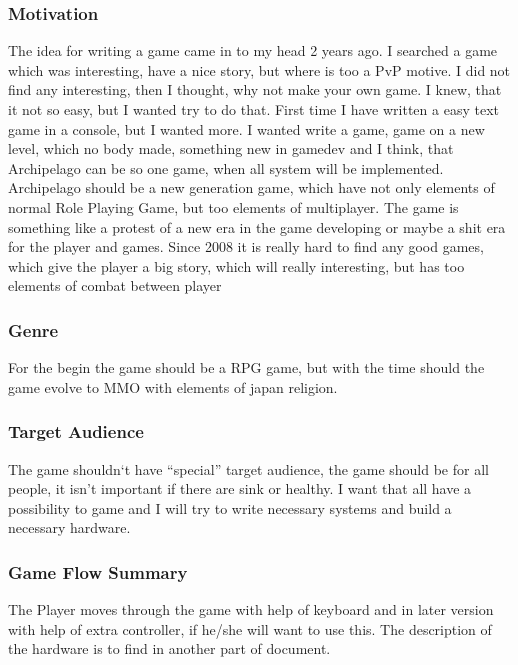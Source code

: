\documentclass[parskip=full]{scrartcl}
\begin{document}
				\subsubsection{Motivation} \vspace{-5mm}
					\par \begingroup
					\leftskip=2cm
					\noindent
							The idea for writing a game came in to my head 2 years ago. I searched a game which was interesting, have a nice story, but where is too a PvP motive. I did not find any interesting, then I thought, why not make your own game. I knew, that it not so easy, but I wanted try to do that. First time I have written a easy text game in a console, but I wanted more. I wanted write a game, game on a new level, which no body made, something new in gamedev and I think, that Archipelago can be so one game, when all system will be implemented. Archipelago should be a new generation game, which have not only elements of normal Role Playing Game, but too elements of multiplayer. The game is something like a protest of a new era in the game developing or maybe a shit era for the player and games. Since 2008 it is really hard to find any good games, which give the player a big story, which will really interesting, but has too elements of combat between player 
					\par \endgroup
				\subsubsection{Genre} \vspace{-5mm}
					\par \begingroup
					\leftskip=2cm
					\noindent
							For the begin the game should be a RPG game, but with the time should the game evolve
							to MMO with elements of japan religion. 
					\par \endgroup
				\subsubsection{Target Audience} \vspace{-5mm}
					\par \begingroup
					\leftskip=2cm
					\noindent
							The game shouldn‘t have “special” target audience, the game should be for all people, it isn’t important if there are sink or healthy. I want that all have a possibility to game and I will try to write necessary systems and build a necessary hardware. 
					\par \endgroup
				\subsubsection{Game Flow Summary} \vspace{-5mm}
					\par \begingroup
					\leftskip=2cm
					\noindent
							The Player moves through the game with help of keyboard and in later version with help of extra controller, if he/she will want to use this. The description of the hardware is to find in another part of document. 
					\par \endgroup
\end{document}
